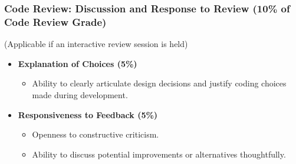 \documentclass{beamer}
\begin{document}

\begin{frame}[t]
\frametitle{Code Review: Discussion and Response to Review (10\% of Code Review Grade)}
\small (Applicable if an interactive review session is held)
\begin{itemize}
    \item \textbf{Explanation of Choices (5\%)}
    \begin{itemize}
        \item Ability to clearly articulate design decisions and justify coding choices made during development.
    \end{itemize}
    \vspace{0.5em}
    \item \textbf{Responsiveness to Feedback (5\%)}
    \begin{itemize}
        \item Openness to constructive criticism.
        \item Ability to discuss potential improvements or alternatives thoughtfully.
    \end{itemize}
\end{itemize}
\end{frame}
\end{document}
